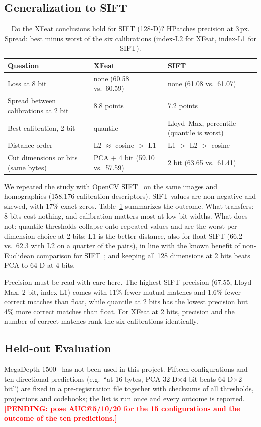 \documentclass[10pt,conference]{IEEEtran}
\newcommand{\pending}[1]{\textcolor{red}{\textbf{[PENDING: #1]}}}
\begin{document}
\subsection{Generalization to SIFT}
\begin{table}[t]
\caption{Do the XFeat conclusions hold for SIFT (128-D)? HPatches precision at 3\,px. Spread: best minus worst of the six calibrations (index-L2 for XFeat, index-L1 for SIFT).}
\label{tab:sift}
\centering\footnotesize
\setlength{\tabcolsep}{3pt}
\begin{tabular}{@{}p{2.55cm}p{2.6cm}p{2.9cm}@{}}
\toprule
Question & XFeat & SIFT\\
\midrule
Loss at 8 bit & none (60.58 vs.\ 60.59) & none (61.08 vs.\ 61.07)\\
Spread between calibrations at 2 bit & 8.8 points & 7.2 points\\
Best calibration, 2 bit & quantile & Lloyd--Max, percentile (quantile is worst)\\
Distance order & L2 $\approx$ cosine $>$ L1 & L1 $>$ L2 $>$ cosine\\
Cut dimensions or bits (same bytes) & PCA + 4 bit (59.10 vs.\ 57.59) & 2 bit (63.65 vs.\ 61.41)\\
\bottomrule
\end{tabular}
\end{table}
We repeated the study with OpenCV SIFT~\cite{sift} on the same images and homographies (158,176 calibration descriptors). SIFT values are non-negative and skewed, with 17\% exact zeros. Table~\ref{tab:sift} summarizes the outcome. What transfers: 8 bits cost nothing, and calibration matters most at low bit-widths. What does not: quantile thresholds collapse onto repeated values and are the worst per-dimension choice at 2 bits; L1 is the better distance, also for float SIFT (66.2 vs.\ 62.3 with L2 on a quarter of the pairs), in line with the known benefit of non-Euclidean comparison for SIFT~\cite{rootsift}; and keeping all 128 dimensions at 2 bits beats PCA to 64-D at 4 bits.

Precision must be read with care here. The highest SIFT precision (67.55, Lloyd--Max, 2 bit, index-L1) comes with 11\% fewer mutual matches and 1.6\% fewer correct matches than float, while quantile at 2 bits has the lowest precision but 4\% more correct matches than float. For XFeat at 2 bits, precision and the number of correct matches rank the six calibrations identically.

\subsection{Held-out Evaluation}
MegaDepth-1500~\cite{megadepth,loftr} has not been used in this project. Fifteen configurations and ten directional predictions (e.g.\ ``at 16 bytes, PCA 32-D$\times$4 bit beats 64-D$\times$2 bit'') are fixed in a pre-registration file together with checksums of all thresholds, projections and codebooks; the list is run once and every outcome is reported. \pending{pose AUC@5/10/20 for the 15 configurations and the outcome of the ten predictions.}
\end{document}

